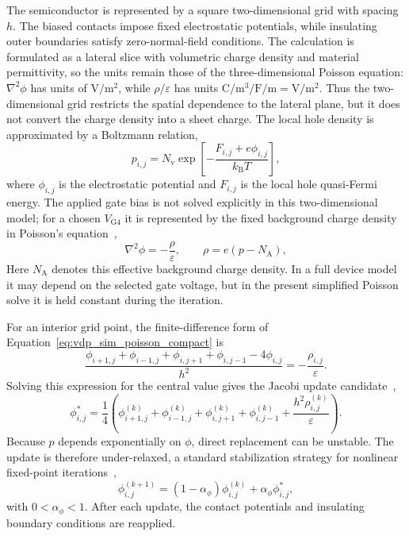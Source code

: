 \begin{appendix}
The semiconductor is represented by a square two-dimensional grid with spacing
$h$. The biased contacts impose fixed electrostatic potentials, while insulating
outer boundaries satisfy zero-normal-field conditions. The calculation is
formulated as a lateral slice with volumetric charge density and material
permittivity, so the units remain those of the three-dimensional Poisson
equation: $\nabla^2\phi$ has units of $\si{\volt\per\metre\squared}$,
while $\rho/\varepsilon$ has units
$\si{\coulomb\per\cubic\metre}/\si{\farad\per\metre}
=\si{\volt\per\metre\squared}$. Thus the two-dimensional grid restricts the
spatial dependence to the lateral plane, but it does not convert the charge
density into a sheet charge. The local hole density is approximated by a
Boltzmann relation,
\begin{equation}
    p_{i,j}
    =N_\mathrm{v}
    \exp\left[-\frac{F_{i,j}+e\phi_{i,j}}{k_\mathrm{B}T}\right],
    \label{eq:vdp_sim_compact_density}
\end{equation}
where $\phi_{i,j}$ is the electrostatic potential and $F_{i,j}$ is the local
hole quasi-Fermi energy. The applied gate bias is not solved explicitly in this
two-dimensional model; for a chosen $V_\mathrm{G4}$ it is represented by the
fixed background charge density in Poisson's equation~\cite{Stodtmann2012OrganicSimulation,Darwish2020DriftDiffusionOFET},
\begin{equation}
    \nabla^2\phi=-\frac{\rho}{\varepsilon},
    \qquad
    \rho=e(p-N_\mathrm{A}),
    \label{eq:vdp_sim_poisson_compact}
\end{equation}
Here $N_\mathrm{A}$ denotes this effective background charge density. In a full device model it may depend on the selected gate voltage, but in the present simplified Poisson solve it is held constant during the iteration.

For an interior grid point, the finite-difference form of
Equation~\eqref{eq:vdp_sim_poisson_compact} is
\begin{equation}
    \frac{
        \phi_{i+1,j}+\phi_{i-1,j}+\phi_{i,j+1}+\phi_{i,j-1}-4\phi_{i,j}
    }{h^2}
    =-\frac{\rho_{i,j}}{\varepsilon}.
    \label{eq:vdp_sim_discrete_poisson}
\end{equation}
Solving this expression for the central value gives the Jacobi update candidate~\cite{hackbusch2016iterative},
\begin{equation}
    \phi^{*}_{i,j}
    =\frac{1}{4}\left(
        \phi^{(k)}_{i+1,j}+\phi^{(k)}_{i-1,j}
        +\phi^{(k)}_{i,j+1}+\phi^{(k)}_{i,j-1}
        +\frac{h^2\rho^{(k)}_{i,j}}{\varepsilon}
    \right).
    \label{eq:vdp_sim_jacobi_candidate}
\end{equation}
Because $p$ depends exponentially on $\phi$, direct replacement can be unstable.
The update is therefore under-relaxed, a standard stabilization strategy for nonlinear fixed-point iterations~\cite{hackbusch2016iterative},
\begin{equation}
    \phi^{(k+1)}_{i,j}
    =(1-\alpha_\phi)\phi^{(k)}_{i,j}
    +\alpha_\phi\phi^{*}_{i,j},
    \label{eq:vdp_sim_relaxed_poisson_update}
\end{equation}
with $0<\alpha_\phi<1$. After each update, the contact potentials and insulating
boundary conditions are reapplied.


\end{appendix}
